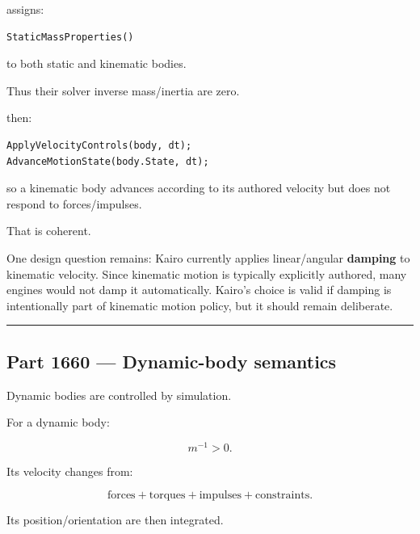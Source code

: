 \hypertarget{06-engine-ii-ch037-current-kairo-semantics}{}

 assigns:

\begin{verbatim}
StaticMassProperties()
\end{verbatim}

to both static and kinematic bodies.

Thus their solver inverse mass/inertia are zero.

 then:

\begin{verbatim}
ApplyVelocityControls(body, dt);
AdvanceMotionState(body.State, dt);
\end{verbatim}

so a kinematic body advances according to its authored velocity but does not respond to forces/impulses.

That is coherent.

One design question remains: Kairo currently applies linear/angular \textbf{damping} to kinematic velocity. Since kinematic motion is typically explicitly authored, many engines would not damp it automatically. Kairo's choice is valid if damping is intentionally part of kinematic motion policy, but it should remain deliberate.

\begin{center}\rule{0.5\linewidth}{0.5pt}\end{center}

\subsection{Part 1660 --- Dynamic-body semantics}\label{06-engine-ii-ch037-part-1660-dynamic-body-semantics}

\hypertarget{06-engine-ii-ch037-part-1660-dynamic-body-semantics}{}

Dynamic bodies are controlled by simulation.

For a dynamic body:

\[
m^{-1}>0.
\]

Its velocity changes from:

\[
\text{forces}
+
\text{torques}
+
\text{impulses}
+
\text{constraints}.
\]

Its position/orientation are then integrated.

